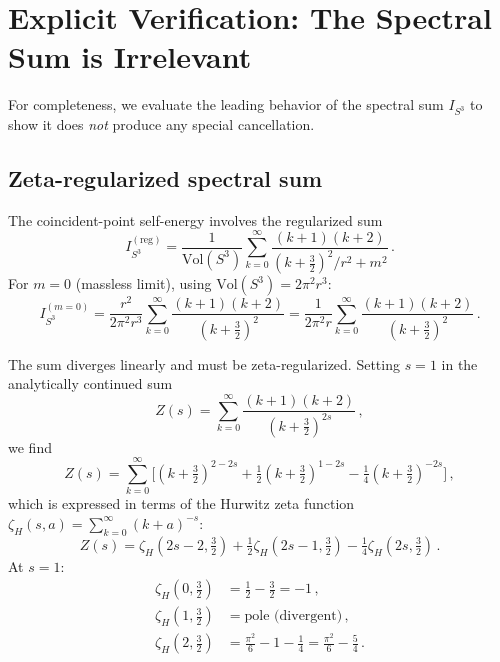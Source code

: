 \documentclass[11pt,a4paper]{article}
\theoremstyle{definition}
\theoremstyle{remark}
\begin{document}
\section{Explicit Verification: The Spectral Sum is Irrelevant}
\label{sec:spectral-verification}

For completeness, we evaluate the leading behavior of the spectral
sum $I_{S^3}$ to show it does \emph{not} produce any special
cancellation.

\subsection{Zeta-regularized spectral sum}

The coincident-point self-energy involves the regularized sum
\begin{equation}\label{eq:zeta-sum}
I_{S^3}^{(\mathrm{reg})} = \frac{1}{\mathrm{Vol}(S^3)}
\sum_{k=0}^{\infty}\frac{(k+1)(k+2)}{(k+\tfrac{3}{2})^2/r^2 + m^2}\,.
\end{equation}
For $m = 0$ (massless limit), using $\mathrm{Vol}(S^3) = 2\pi^2 r^3$:
\begin{equation}
I_{S^3}^{(m=0)} = \frac{r^2}{2\pi^2 r^3}\sum_{k=0}^{\infty}
\frac{(k+1)(k+2)}{(k+\tfrac{3}{2})^2}
= \frac{1}{2\pi^2 r}\sum_{k=0}^{\infty}
\frac{(k+1)(k+2)}{(k+\tfrac{3}{2})^2}\,.
\end{equation}

The sum diverges linearly and must be zeta-regularized.  Setting
$s = 1$ in the analytically continued sum
\[
Z(s) = \sum_{k=0}^{\infty}\frac{(k+1)(k+2)}{(k+\tfrac{3}{2})^{2s}}\,,
\]
we find
\begin{equation}
Z(s) = \sum_{k=0}^{\infty}\bigl[(k+\tfrac{3}{2})^{2-2s}
+ \tfrac{1}{2}(k+\tfrac{3}{2})^{1-2s}
- \tfrac{1}{4}(k+\tfrac{3}{2})^{-2s}\bigr]\,,
\end{equation}
which is expressed in terms of the Hurwitz zeta function
$\zeta_H(s,a) = \sum_{k=0}^\infty (k+a)^{-s}$:
\begin{equation}
Z(s) = \zeta_H(2s-2,\tfrac{3}{2}) + \tfrac{1}{2}\zeta_H(2s-1,\tfrac{3}{2})
- \tfrac{1}{4}\zeta_H(2s,\tfrac{3}{2})\,.
\end{equation}
At $s = 1$:
\begin{align}
\zeta_H(0,\tfrac{3}{2}) &= \tfrac{1}{2} - \tfrac{3}{2} = -1\,,\label{eq:hz1}\\
\zeta_H(1,\tfrac{3}{2}) &= \text{pole (divergent)}\,,\label{eq:hz2}\\
\zeta_H(2,\tfrac{3}{2}) &= \frac{\pi^2}{6} - 1 - \frac{1}{4}
= \frac{\pi^2}{6} - \frac{5}{4}\,.\label{eq:hz3}
\end{align}
\end{document}
